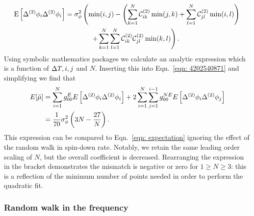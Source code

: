 \begin{align}
\E{\Delta^{(2)}\phi_{i}\Delta^{(2)}\phi_{i}} & =
\sigma^{2}_{\phi} \left(\min(i, j) - \left(\s{k=1}{N}\CT_{ik} \min(j, k)
+ \s{l=1}{N}\CT_{jl}\min(i, l) \right)\right. \notag \\
& \hspace{13mm} \left. + \s{k=1}{N}\s{l=1}{N}\CT_{ik}\CT_{jl}\min(k, l)\right).
\label{eqn: expected mismatch dP0idP0j_k2}
\end{align}
Using symbolic mathematics packages we
calculate an analytic expression which is a function of $\Delta T, i, j$ and $N$.
Inserting this into Eqn.~\eqref{eqn: 4202540871} and simplifying we find that
\begin{align}
E[\tilde{\mu}]  & = \sum_{i=1}^{N}g_{00}^{E} E\left[\Delta^{(2)}\phi_{i}\Delta^{(2)}\phi_{i}\right]
+ 2 \sum_{i=1}^{N}\sum_{j=1}^{i-1}g_{00}^{NE}E\left[\Delta^{(2)}\phi_{i}\Delta^{(2)}\phi_{j}\right]  \\
& = \frac{1}{70}\sigma_{\phi}^{2}\left(3N - \frac{27}{N}\right).
\label{eqn: Expected mismatch RW in phase k2}
\end{align}
This expression can be compared to Eqn.~\eqref{eqn: expectation} ignoring the
effect of the random walk in spin-down rate. Notably, we retain the same
leading order scaling of $N$, but the overall coefficient is decreased.
Rearranging the expression in the bracket demonstrates the mismatch is negative
or zero for $1 \ge N \ge 3$: this is a reflection of the minimum number of
points needed in order to perform the quadratic fit.

\subsubsection{Random walk in the frequency}

